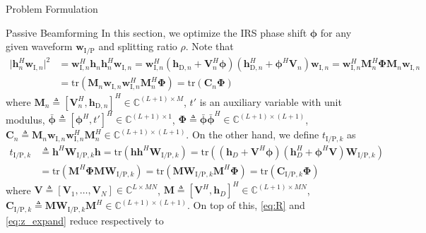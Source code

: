\documentclass[journal,12pt,onecolumn,draftclsnofoot]{IEEEtran}
\begin{document}
\begin{section}{Problem Formulation}
		\begin{subsection}{Passive Beamforming}
			In this section, we optimize the IRS phase shift $\boldsymbol{\phi}$ for any given waveform $\boldsymbol{w}_{\mathrm{I/P}}$ and splitting ratio $\rho$. Note that
			\begin{align}
				\lvert \boldsymbol{h}_{n}^H\boldsymbol{w}_{\mathrm{I},n} \rvert^2
				& = \boldsymbol{w}_{\mathrm{I},n}^H\boldsymbol{h}_n\boldsymbol{h}_n^H\boldsymbol{w}_{\mathrm{I},n}
				= \boldsymbol{w}_{\mathrm{I},n}^H(\boldsymbol{h}_{\mathrm{D},n}+\boldsymbol{V}_n^H\boldsymbol{\phi})(\boldsymbol{h}_{\mathrm{D},n}^H+\boldsymbol{\phi}^H\boldsymbol{V}_n)\boldsymbol{w}_{\mathrm{I},n}
				= \boldsymbol{w}_{\mathrm{I},n}^H\boldsymbol{M}_n^H\boldsymbol{\Phi}\boldsymbol{M}_n\boldsymbol{w}_{\mathrm{I},n}\nonumber\\
				& = \mathrm{tr}(\boldsymbol{M}_n\boldsymbol{w}_{\mathrm{I},n}\boldsymbol{w}_{\mathrm{I},n}^H\boldsymbol{M}_n^H\boldsymbol{\Phi})
				= \mathrm{tr}(\boldsymbol{C}_n\boldsymbol{\Phi})
			\end{align}
			where $\boldsymbol{M}_n \triangleq [\boldsymbol{V}_n^H, \boldsymbol{h}_{\mathrm{D},n}]^H \in \mathbb{C}^{(L+1) \times M}$, $t'$ is an auxiliary variable with unit modulus, $\bar{\boldsymbol{\phi}} \triangleq [\boldsymbol{\phi}^H, t']^H \in \mathbb{C}^{(L+1) \times 1}$, $\boldsymbol{\Phi} \triangleq \bar{\boldsymbol{\phi}}\bar{\boldsymbol{\phi}}^H \in \mathbb{C}^{(L+1) \times (L+1)}$, $\boldsymbol{C}_n \triangleq \boldsymbol{M}_n\boldsymbol{w}_{\mathrm{I},n}\boldsymbol{w}_{\mathrm{I},n}^H\boldsymbol{M}_n^H \in \mathbb{C}^{(L+1)\times(L+1)}$. On the other hand, we define $t_{\mathrm{I/P},k}$ as
			\begin{align}
				t_{\mathrm{I/P},k}
				& \triangleq \boldsymbol{h}^H\boldsymbol{W}_{\mathrm{I/P},k}\boldsymbol{h}
				= \mathrm{tr}(\boldsymbol{h}\boldsymbol{h}^H\boldsymbol{W}_{\mathrm{I/P},k})
				= \mathrm{tr}\left((\boldsymbol{h}_{D}+\boldsymbol{V}^H\boldsymbol{\phi})(\boldsymbol{h}_{D}^H+\boldsymbol{\phi}^H\boldsymbol{V})\boldsymbol{W}_{\mathrm{I/P},k}\right)\nonumber\\
				& = \mathrm{tr}(\boldsymbol{M}^H\boldsymbol{\Phi}\boldsymbol{M}\boldsymbol{W}_{\mathrm{I/P},k})
				= \mathrm{tr}(\boldsymbol{M}\boldsymbol{W}_{\mathrm{I/P},k}\boldsymbol{M}^H\boldsymbol{\Phi})
				= \mathrm{tr}(\boldsymbol{C}_{\mathrm{I/P},k}\boldsymbol{\Phi})\label{eq:t_k}
			\end{align}
			where $\boldsymbol{V} \triangleq [\boldsymbol{V}_1,\dots,\boldsymbol{V}_N] \in \mathbb{C}^{L \times MN}$, $\boldsymbol{M} \triangleq [\boldsymbol{V}^H, \boldsymbol{h}_{D}]^H \in \mathbb{C}^{(L+1) \times MN}$, $\boldsymbol{C}_{\mathrm{I/P},k} \triangleq \boldsymbol{M}\boldsymbol{W}_{\mathrm{I/P},k}\boldsymbol{M}^H \in \mathbb{C}^{(L+1)\times(L+1)}$. On top of this, \eqref{eq:R} and \eqref{eq:z_expand} reduce respectively to

\end{subsection}
\end{section}
\end{document}
